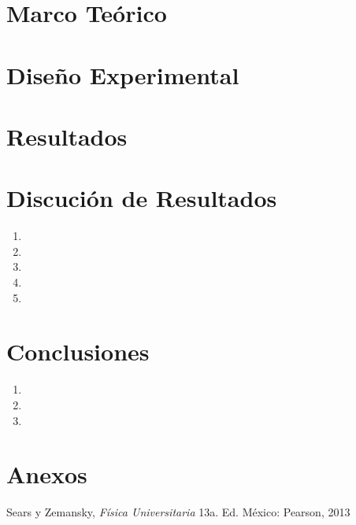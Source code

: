 \documentclass[conference]{IEEEtran}
\begin{document}
\section{Marco Teórico}
    
    
\section{Diseño Experimental}
    

    
\section{Resultados}
    
    
    
\section{Discución de Resultados}
    \begin{enumerate}
        \item 
        \item 
        \item 
        \item 
        \item 
    \end{enumerate}
    
\section{Conclusiones}
    \begin{enumerate}
        \item 
        \item 
        \item 
    \end{enumerate}




\section{Anexos}
    
    
    
    
    
\begin{thebibliography}{00}
 Sears y Zemansky, \textit{Física Universitaria} 13a. Ed. México: Pearson, 2013
\end{thebibliography}
\end{document}
